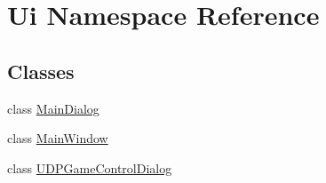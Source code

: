 \hypertarget{namespace_ui}{\section{Ui Namespace Reference}
\label{namespace_ui}
}
\subsection*{Classes}
\begin{DoxyCompactItemize}
\item 
class \hyperlink{class_ui_1_1_main_dialog}{Main\-Dialog}
\item 
class \hyperlink{class_ui_1_1_main_window}{Main\-Window}
\item 
class \hyperlink{class_ui_1_1_u_d_p_game_control_dialog}{U\-D\-P\-Game\-Control\-Dialog}
\end{DoxyCompactItemize}
